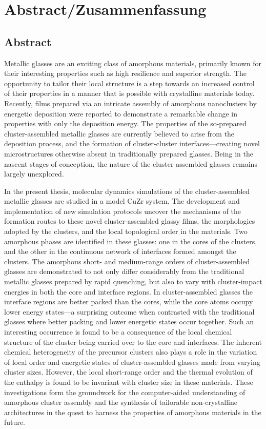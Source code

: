 \chapter*{Abstract/Zusammenfassung}

\section*{Abstract}
Metallic glasses are an exciting class of amorphous materials, primarily known for their interesting properties such as high resilience and superior strength. The opportunity to tailor their local structure is a step towards an increased control of their properties in a manner that is possible with crystalline materials today. Recently, films prepared via an intricate assembly of amorphous nanoclusters by energetic deposition were reported to demonstrate a remarkable change in properties with only the deposition energy. The properties of the so-prepared cluster-assembled metallic glasses are currently believed to arise from the deposition process, and the formation of cluster-cluster interfaces---creating novel microstructures otherwise absent in traditionally prepared glasses. Being in the nascent stages of conception, the nature of the cluster-assembled glasses remains largely unexplored. \par

In the present thesis, molecular dynamics simulations of the cluster-assembled metallic glasses are studied in a model CuZr system. The development and implementation of new simulation protocols uncover the mechanisms of the formation routes to these novel cluster-assembled glassy films, the morphologies adopted by the clusters, and the local topological order in the materials. Two amorphous phases are identified in these glasses: one in the cores of the clusters, and the other in the continuous network of interfaces formed amongst the clusters. The amorphous short- and medium-range orders of cluster-assembled glasses are demonstrated to not only differ considerably from the traditional metallic glasses prepared by rapid quenching, but also to vary with cluster-impact energies in both the core and interface regions. In cluster-assembled glasses the interface regions are better packed than the cores, while the core atoms occupy lower energy states---a surprising outcome when contrasted with the traditional glasses where better packing and lower energetic states occur together. Such an interesting occurrence is found to be a consequence of the local chemical structure of the cluster being carried over to the core and interfaces. The inherent chemical heterogeneity of the precursor clusters also plays a role in the variation of local order and energetic states of cluster-assembled glasses made from varying cluster sizes. However, the local short-range order and the thermal evolution of the enthalpy is found to be invariant with cluster size in these materials. These investigations form the groundwork for the computer-aided understanding of amorphous cluster assembly and the synthesis of tailorable non-crystalline architectures in the quest to harness the properties of amorphous materials in the future. %

